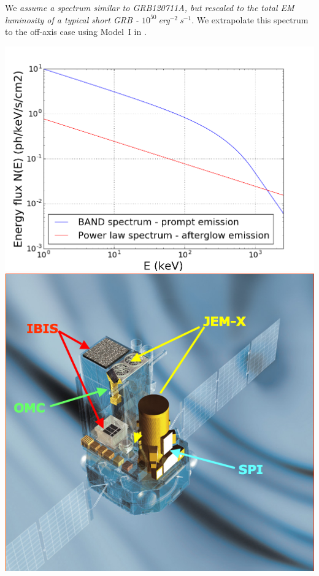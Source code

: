 \documentclass[12pt, a4]{article}
\begin{document}
We \emph{assume a spectrum similar to GRB120711A, but rescaled to the total EM
luminosity of a typical short GRB - $10^{50}~$erg$^{-2}~$s$^{-1}$}. We extrapolate
this spectrum to the off-axis case using Model~I in \cite{2016arXiv160606124P}.

\begin{center}
    \includegraphics[scale=.2]{spectra.png}
    \includegraphics[scale=.2]{INTEGRAL.jpg}
    \vspace*{-0.8cm}
    \label{spectra}
\end{center}
\end{document}
